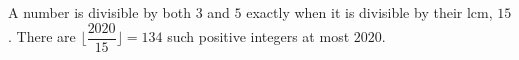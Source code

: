 A number is divisible by both $3$ and $5$ exactly when it is divisible by their lcm, $15$. There are $\lfloor\dfrac{2020}{15}\rfloor=\boxed{134}$ such positive integers at most $2020$.
